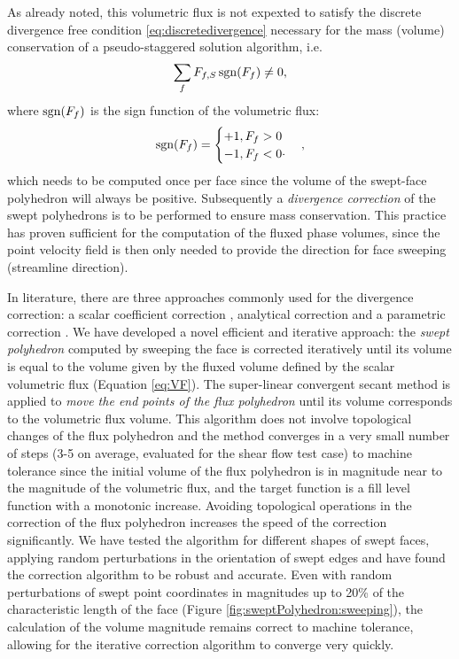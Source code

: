As already noted, this volumetric flux is not expexted to satisfy the discrete 
divergence free condition \eqref{eq:discretedivergence} necessary for the mass 
(volume) conservation of a pseudo-staggered solution algorithm, i.e.\
\begin{equation}
    \sum_f {F_{f,S}} \operatorname{sgn}(F_f) \ne 0,
\end{equation}
where $\operatorname{sgn}(F_f)$ is the sign function of the volumetric flux: 
\begin{equation} 
   \operatorname{sgn}(F_f) = \begin{cases} 
                    +1 , F_f > 0 \\
                    -1 , F_f < 0  \cdot  
              \end{cases},
\end{equation}
%
%
which needs to be computed once per face since the volume of the swept-face polyhedron 
will always be positive. Subsequently a \emph{divergence correction} of the swept 
polyhedrons is to be performed to ensure mass conservation. %
This practice has proven sufficient for the computation of the fluxed phase volumes, 
since the point velocity field is then only needed to provide the direction for face 
sweeping (streamline direction).%

In literature, there are three approaches commonly used for the divergence
correction: a scalar coefficient correction \citep{LiovicCVTNA2006}, analytical
correction \citep{HernandezLopezPart1Advection2008} and a parametric correction
\citep{MencingerZunAdaptive2011}. We have developed a novel efficient and 
iterative approach: %
the \emph{swept polyhedron} computed by sweeping the face is corrected iteratively 
until its volume is equal to the volume given by the fluxed volume defined by the 
scalar volumetric flux (Equation \ref{eq:VF}).
The super-linear convergent secant method is applied to \emph{move the end points
of the flux polyhedron} until its volume corresponds to the volumetric flux volume. 
This algorithm does not involve topological changes of the flux polyhedron and the 
method converges in a very small number of steps (3-5 on average, evaluated for 
the shear flow test case) to machine tolerance since the initial volume of the flux 
polyhedron is in magnitude near to the magnitude of the volumetric flux, and the 
target function is a fill level function with a monotonic increase. Avoiding 
topological operations in the correction of the flux polyhedron increases the speed 
of the correction significantly. We have tested the algorithm for different shapes 
of swept faces, applying random perturbations in the orientation of swept edges 
and have found the correction algorithm to be robust and accurate. Even with 
random perturbations of swept point coordinates in magnitudes up to 20\% of the 
characteristic length of the face (Figure \ref{fig:sweptPolyhedron:sweeping}), 
the calculation of the volume magnitude remains correct to machine tolerance, 
allowing for the iterative correction algorithm to converge very quickly. 

